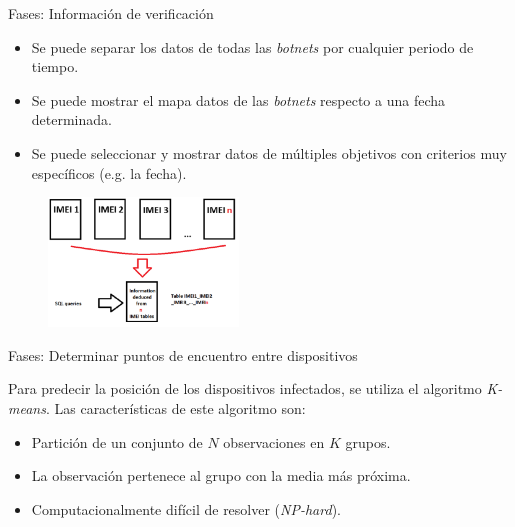 \documentclass[aspectratio=43]{beamer}
\begin{document}
\begin{frame}{Fases: Información de verificación}

\begin{itemize}
\item Se puede separar los datos de todas las \emph{botnets} por cualquier periodo de tiempo.

\item Se puede mostrar el mapa datos de las \emph{botnets} respecto a una fecha determinada.

\item Se puede seleccionar y mostrar datos de múltiples objetivos con criterios muy específicos (e.g. la fecha).
\end{itemize}

  	\begin{figure}[htbp] 

   \includegraphics[width=0.45\textwidth]{figuras/IMEIsConcatenados}  
  \label{IMEIsConcatenados}

\end{figure}

\end{frame}

\begin{frame}{Fases: Determinar puntos de encuentro entre dispositivos}

Para predecir la posición de los dispositivos infectados, se utiliza el algoritmo \emph{K-means}. Las características de este algoritmo son:

\begin{itemize}
\item Partición de un conjunto de $N$ observaciones en $K$ grupos.
\item La observación pertenece al grupo con la media más próxima.
\item Computacionalmente difícil de resolver (\emph{NP-hard}).
\end{itemize}
  
\end{frame}
\end{document}
